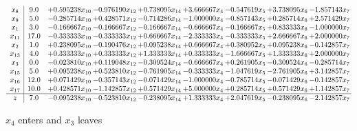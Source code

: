 \documentclass[10pt]{article}
\begin{document}
 \[\begin{array}{c| c c@{\hskip 2pt} c@{\hskip 2pt} c@{\hskip 2pt} c@{\hskip 2pt} c@{\hskip 2pt} c@{\hskip 2pt} c@{\hskip 2pt} }
 x_{8}   &  9.0 & + 0.595238 x_{10} & -0.976190 x_{12} & + 0.738095 x_{14} & + 3.666667 x_{4} & -0.547619 x_{5} & + 3.738095 x_{6} & -1.857143 x_{7}\\
 x_{9}   &  5.0 & -0.285714 x_{10} & + 0.428571 x_{12} & -0.714286 x_{14} & -1.000000 x_{4} & -0.857143 x_{5} & + 0.285714 x_{6} & + 2.571429 x_{7}\\
 x_{1}   &  3.0 & -0.166667 x_{10} & -0.166667 x_{12} & -0.166667 x_{14} & -0.666667 x_{4} & -0.166667 x_{5} & + 0.833333 x_{6} & -1.000000 x_{7}\\
 x_{11}   &  17.0 & -0.333333 x_{10} & -0.333333 x_{12} & + 0.666667 x_{14} & -2.333333 x_{4} & -0.333333 x_{5} & + 2.666667 x_{6} & + 2.000000 x_{7}\\
 x_{2}   &  1.0 & + 0.238095 x_{10} & -0.190476 x_{12} & + 0.095238 x_{14} & + 0.666667 x_{4} & + 0.380952 x_{5} & + 0.095238 x_{6} & -0.142857 x_{7}\\
 x_{13}   &  4.0 & + 0.333333 x_{10} & + 0.333333 x_{12} & + 1.333333 x_{14} & + 0.333333 x_{4} & -1.666667 x_{5} & + 1.333333 x_{6} & + 2.000000 x_{7}\\
 x_{3}   &  0.0 & -0.023810 x_{10} & + 0.119048 x_{12} & -0.309524 x_{14} & -0.666667 x_{4} & + 0.261905 x_{5} & -0.309524 x_{6} & -0.285714 x_{7}\\
 x_{15}   &  5.0 & + 0.095238 x_{10} & + 0.523810 x_{12} & -0.761905 x_{14} & -0.333333 x_{4} & -1.047619 x_{5} & -2.761905 x_{6} & + 3.142857 x_{7}\\
 x_{16}   &  12.0 & + 0.071429 x_{10} & -0.357143 x_{12} & -0.071429 x_{14} & -1.000000 x_{4} & -0.785714 x_{5} & -0.071429 x_{6} & -0.142857 x_{7}\\
 x_{17}   &  10.0 & + 0.428571 x_{10} & -1.142857 x_{12} & + 0.571429 x_{14} & + 5.000000 x_{4} & + 0.285714 x_{5} & + 0.571429 x_{6} & + 1.142857 x_{7}\\
\hline
z    &  7.0 & -0.095238 x_{10} & -0.523810 x_{12} & -0.238095 x_{14} & + 1.333333 x_{4} & + 2.047619 x_{5} & -0.238095 x_{6} & -2.142857 x_{7}\\
\end{array}\]


 $ x_{4} $ enters and $ x_{3} $ leaves 
\end{document}
